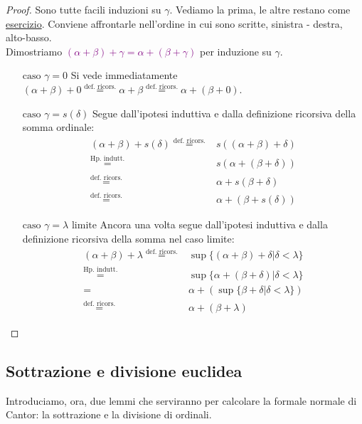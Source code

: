 \documentclass[11pt]{scrartcl}
\begin{document}
\begin{proof}
	Sono tutte facili induzioni su $\gamma$. Vediamo la prima, le altre restano come \underline{esercizio}. Conviene affrontarle nell'ordine in cui sono scritte, sinistra - destra, alto-basso.\\
	Dimostriamo \textcolor{purple}{$(\alpha + \beta) + \gamma = \alpha + (\beta + \gamma)$} per induzione su $\gamma$.
	\begin{itemize}
		\item[$\boxed{\text{caso $\gamma = 0$}}$] Si vede immediatamente $(\alpha + \beta) + 0 \overset{\text{def. ricors.}}{=} \alpha + \beta \overset{\text{def. ricors.}}{=} \alpha + (\beta + 0)$.
		\item[$\boxed{\text{caso $\gamma = s(\delta)$}}$] Segue dall'ipotesi induttiva e dalla definizione ricorsiva della somma ordinale:
		\[\begin{split}
			(\alpha + \beta) + s(\delta) \overset{\text{def. ricors.}}{=}& s((\alpha + \beta) + \delta) \\
										 \overset{\text{Hp. indutt.}}{=}& s(\alpha + (\beta + \delta)) \\
										 \overset{\text{def. ricors.}}{=}& \alpha + s(\beta + \delta) \\
										 \overset{\text{def. ricors.}}{=}& \alpha + (\beta + s(\delta))
		\end{split}
			\]
		\item[$\boxed{\text{caso $\gamma = \lambda$ limite}}$] Ancora una volta segue dall'ipotesi induttiva e dalla definizione ricorsiva della somma nel caso limite:
		\[ \begin{split}
			(\alpha + \beta) + \lambda \overset{\text{def. ricors.}}{=}& \sup\{(\alpha + \beta) + \delta | \delta < \lambda\} \\
									   \overset{\text{Hp. indutt.}}{=}& \sup\{\alpha + (\beta + \delta) | \delta < \lambda\} \\
																	 =\quad\;\, &\alpha + (\sup\{\beta + \delta | \delta < \lambda\}) \\
										\overset{\text{def. ricors.}}{=}& \alpha + (\beta + \lambda)
			\end{split}
			\]
	\end{itemize}	
\end{proof}



\subsection{Sottrazione e divisione euclidea}
Introduciamo, ora, due lemmi che serviranno per calcolare la formale normale di Cantor: la sottrazione e la divisione di ordinali.
\end{document}
